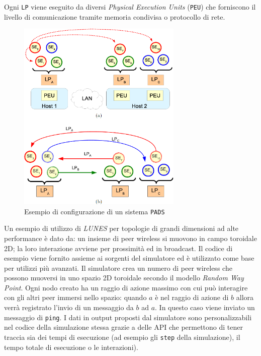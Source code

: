 Ogni \texttt{LP} viene eseguito da diversi \textit{Physical Execution Units} (\texttt{PEU}) che forniscono il livello di comunicazione tramite memoria condivisa o protocollo di rete.
\begin{figure}[H]
    \centering
    \includegraphics[width=0.7\textwidth]{images/PADS_example.png}
    \caption{Esempio di configurazione di un sistema \texttt{PADS}}
\end{figure}
Un esempio di utilizzo di \textit{LUNES} per topologie di grandi dimensioni ad alte performance è dato da: un insieme di peer wireless si muovono in campo toroidale 2D; la loro interazione avviene per prossimità ed in broadcast. Il codice di esempio viene fornito assieme ai sorgenti del simulatore ed è utilizzato come base per utilizzi più avanzati.\newline
Il simulatore crea un numero di peer wireless che possono muoversi in uno spazio 2D toroidale secondo il modello \textit{Random Way Point}. Ogni nodo creato ha un raggio di azione massimo con cui può interagire con gli altri peer immersi nello spazio: quando $a$ è nel raggio di azione di $b$ allora verrà registrato l'invio di un messaggio da $b$ ad $a$. In questo caso viene inviato un messaggio di \texttt{ping}. I dati in output proposti dal simulatore sono personalizzabili nel codice della simulazione stessa grazie a delle API che permettono di tener traccia sia dei tempi di esecuzione (ad esempio gli \texttt{step} della simulazione), il tempo totale di esecuzione o le interazioni).

